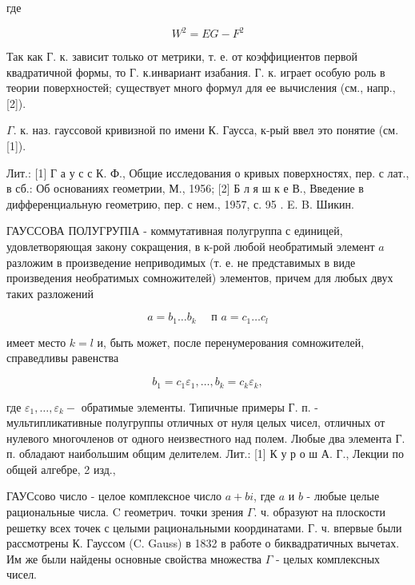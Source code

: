 \documentclass[10pt]{article}
\begin{document}
где



\[

W^{2}=E G-F^{2}

\]



Так как Г. к. зависит только от метрики, т. е. от коэффициентов первой квадратичной формы, то Г. к.инвариант изабания. Г. к. играет особую роль в теории поверхностей; существует много формул для ее вычисления (см., напр., [2]).



$\Gamma$. к. наз. гауссовой кривизной по имени К. Гаусса, к-рый ввел это понятие (см. [1]).



Лит.: [1] Г а у с с К. Ф., Общие исследования о кривых поверхностях, пер. с лат., в сб.: Об основаниях геометрии, М., 1956; [2] Б л я ш к е В., Введение в дифференциальную геометрию, пер. с нем., 1957, с. 95 . E. B. Шикин.



ГАУССОВА ПОЛУГРУПІА - коммутативная полугруппа с единицей, удовлетворяющая закону сокращения, в к-рой любой необратимый элемент $a$ разложим в произведение неприводимых (т. е. не представимых в виде произведения необратимых сомножителей) элементов, причем для любых двух таких разложений



\[

a=b_{1} \ldots b_{k} \quad \text { п } a=c_{1} \ldots c_{l}

\]



имеет место $k=l$ и, быть может, после перенумерования сомножителей, справедливы равенства



\[

b_{1}=c_{1} \varepsilon_{1}, \ldots, b_{k}=c_{k} \varepsilon_{k},

\]



где $\varepsilon_{1}, \ldots, \varepsilon_{k}-$ обратимые элементы. Типичные примеры Г. п. - мультипликативные полугруппы отличных от нуля целых чисел, отличных от нулевого многочленов от одного неизвестного над полем. Любые два элемента Г. п. обладают наибольшим общим делителем. Лит.: [1] К у р о ш А. Г., Лекции по общей алгебре, 2 изд.,



ГАУСсово число - целое комплексное число $a+b i$, где $a$ и $b$ - любые целые рациональные числа. $\mathrm{C}$ геометрич. точки зрения $\Gamma$. ч. образуют на плоскости решетку всех точек с целыми рациональными координатами. Г. ч. впервые были рассмотрены К. Гауссом (C. Gauss) в 1832 в работе о биквадратичных вычетах. Им же были найдены основные свойства множества $\Gamma$ - целых комплексных чисел.
\end{document}
